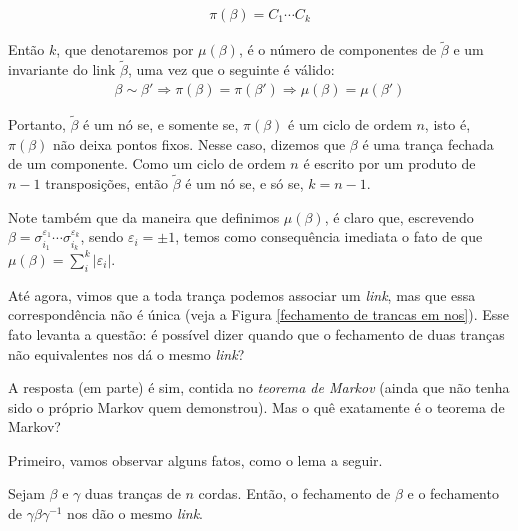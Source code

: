 	\begin{align*}
	\pi(\beta) = C_1\cdots C_k
	\end{align*} 
	\par\vspace{0.3cm} Então $k$, que denotaremos por $\mu(\beta)$, é o número de componentes de $\widetilde{\beta}$ e um invariante do link $\widetilde{\beta}$, uma vez que o seguinte é válido:
	\begin{align*}
	\beta\sim\beta' \Rightarrow \pi(\beta) = \pi(\beta') \Rightarrow \mu(\beta) = \mu(\beta')
	\end{align*}
	\par\vspace{0.3cm} Portanto, $\widetilde{\beta}$ é um nó se, e somente se, $\pi(\beta)$ é um ciclo de ordem $n$, isto é, $\pi(\beta)$ não deixa pontos fixos. Nesse caso, dizemos que $\beta$ é uma trança fechada de um componente. Como um ciclo de ordem $n$ é escrito por um produto de $n-1$ transposições, então $\widetilde{\beta}$ é um nó se, e só se, $k = n-1$.
	\par\vspace{0.3cm} Note também que da maneira que definimos $\mu(\beta)$, é claro que, escrevendo $\beta = \sigma_{i_1}^{\varepsilon_1}\cdots\sigma_{i_k}^{\varepsilon_k}$, sendo $\varepsilon_i = \pm1$, temos como consequência imediata o fato de que $\mu(\beta) = \displaystyle{\sum_{i}^{k}|\varepsilon_i|}$. 
	\par\vspace{0.3cm} Até agora, vimos que a toda trança podemos associar um \textit{link}, mas que essa correspondência não é única (veja a Figura \eqref{fechamento de trancas em nos}). Esse fato levanta a questão: é possível dizer quando que o fechamento de duas tranças não equivalentes nos dá o mesmo \textit{link}? 
	\par\vspace{0.3cm} A resposta (em parte) é sim, contida no \textit{teorema de Markov} (ainda que não tenha sido o próprio Markov quem demonstrou). Mas o quê exatamente é o teorema de Markov?
	\par\vspace{0.3cm} Primeiro, vamos observar alguns fatos, como o lema a seguir.
	
	\begin{lemma}
		\label{conjugacoes dao o mesmo link}
		Sejam $\beta$ e $\gamma$ duas tranças de $n$ cordas. Então, o fechamento de $\beta$ e o fechamento de $\gamma\beta\gamma^{-1}$ nos dão o mesmo \textit{link}.
	\end{lemma}
	
